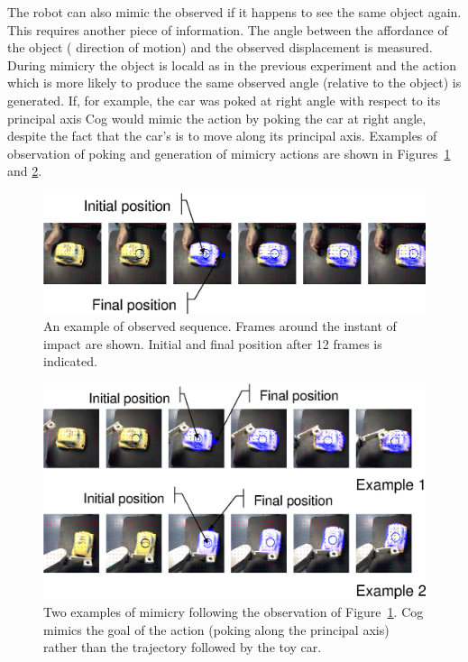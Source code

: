 The robot can also mimic the observed \ahhbehavior{} if it happens to see the 
same object again. This requires another piece of information. The angle 
between the affordance of the object (\ahhpreferred{} direction of motion) and the 
observed displacement is measured. During mimicry the object is local\ize{}d as 
in the previous experiment and the action which is more likely to 
produce the same observed angle (relative to the object) is generated. 
If, for example, the car was poked at right angle with respect to its principal 
axis Cog would mimic the action by poking the car at right angle, despite 
the fact that the car's \ahhpreferred{} \ahhbehavior{} is to move along its principal 
axis. Examples of observation of poking and generation of mimicry actions are 
shown in Figures~\ref{fig:observed-action} and \ref{fig:mimicked-action}.

%
%
\begin{figure}[tb]
\begin{center}
\includegraphics[width=\columnwidth]{observed-action.eps}
\caption{ 
\label{fig:observed-action}
%
%
An example of observed sequence. Frames around the instant of impact are shown.
Initial and final position after 12 frames is indicated.
}
\end{center}
\end{figure}
%
%

%
%
\begin{figure}[tb]
\begin{center}
\includegraphics[width=\columnwidth]{mimicked-action.eps}
\caption{ 
\label{fig:mimicked-action}
%
%
Two examples of mimicry following the observation of Figure~\ref{fig:observed-action}. 
Cog mimics the goal of the action (poking along the principal axis) rather than
the trajectory followed by the toy car.
}
\end{center}
\end{figure}
%
%






